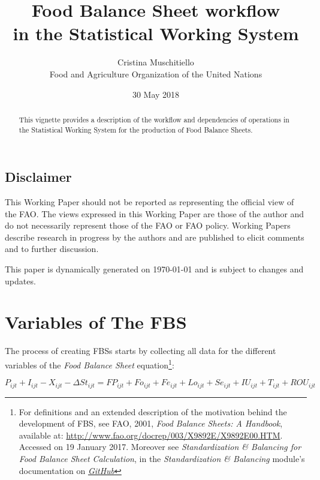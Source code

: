 \documentclass[]{article}
\title{Food Balance Sheet workflow\\
in the Statistical Working System}
\author{Cristina Muschitiello\\
Food and Agriculture Organization of the United Nations}
\date{30 May 2018}
\let\rmarkdownfootnote\footnote%
\def\footnote{\protect\rmarkdownfootnote}
\begin{document}
\maketitle
\begin{abstract}
This vignette provides a description of the workflow and dependencies of
operations in the Statistical Working System for the production of Food
Balance Sheets.
\end{abstract}

{
\setcounter{tocdepth}{4}
\tableofcontents
}
\listoftables

\listoffigures

\newpage

\subsection*{Disclaimer}\label{disclaimer}

This Working Paper should not be reported as representing the official
view of the FAO. The views expressed in this Working Paper are those of
the author and do not necessarily represent those of the FAO or FAO
policy. Working Papers describe research in progress by the authors and
are published to elicit comments and to further discussion.

This paper is dynamically generated on \today{} and is subject to
changes and updates.

\section*{Variables of The FBS}\label{variables-of-the-fbs}

The process of creating FBSs starts by collecting all data for the
different variables of the \emph{Food Balance Sheet} equation\footnote{For
  definitions and an extended description of the motivation behind the
  development of FBS, see FAO, 2001, \emph{Food Balance Sheets: A
  Handbook}, available at:
  \url{http://www.fao.org/docrep/003/X9892E/X9892E00.HTM}. Accessed on
  19 January 2017. Moreover see \emph{Standardization \& Balancing for
  Food Balance Sheet Calculation}, in the \emph{Standardization \&
  Balancing} module's documentation on
  \href{https://github.com/SWS-Methodology/faoswsStandardization/tree/master/documentation}{\emph{GitHub}}}:

\begin{equation}
\label{eq:balance1}
P_{ijt} + I_{ijt} - X_{ijt} - \Delta St_{ijt} = FP_{ijt} + Fo_{ijt} + Fe_{ijt} + Lo_{ijt} + Se_{ijt} + IU_{ijt} + T_{ijt}  + ROU_{ijt}
\end{equation}
\end{document}
